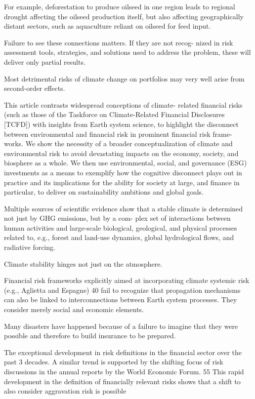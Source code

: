 \documentclass[
]{book}
\begin{document}
For example, deforestation to
produce oilseed in one region leads to regional drought affecting
the oilseed production itself, but also affecting geographically
distant sectors, such as aquaculture reliant on oilseed for
feed input.

Failure to see these connections matters. If they are not recog-
nized in risk assessment tools, strategies, and solutions used to
address the problem, these will deliver only partial results.

Most detrimental risks of climate change on portfolios may
very well arise from second-order effects.

This article contrasts widespread conceptions of climate-
related financial risks (such as those of the Taskforce on
Climate-Related Financial Disclosures {[}TCFD{]}) with insights
from Earth system science, to highlight the disconnect between
environmental and financial risk in prominent financial risk frame-
works. We show the necessity of a broader conceptualization of
climate and environmental risk to avoid devastating impacts on
the economy, society, and biosphere as a whole. We then use
environmental, social, and governance (ESG) investments as a
means to exemplify how the cognitive disconnect plays out in
practice and its implications for the ability for society at large,
and finance in particular, to deliver on sustainability ambitions
and global goals.

Multiple sources of scientific evidence show that a stable
climate is determined not just by GHG emissions, but by a com-
plex set of interactions between human activities and large-scale
biological, geological, and physical processes related to, e.g.,
forest and land-use dynamics, global hydrological flows, and
radiative forcing.

Climate stability hinges not just on the atmosphere.

Financial risk frameworks explicitly aimed at
incorporating climate systemic risk (e.g., Aglietta and Espagne) 40
fail to recognize that propagation mechanisms can also be linked
to interconnections between Earth system processes. They
consider merely social and economic elements.

Many disasters have happened because of a failure to imagine
that they were possible and therefore to build insurance to be
prepared.

The exceptional development in risk definitions in the financial
sector over the past 3 decades. A similar
trend is supported by the shifting focus of risk discussions in
the annual reports by the World Economic Forum. 55 This rapid
development in the definition of financially relevant risks shows
that a shift to also consider aggravation risk is possible
\end{document}
